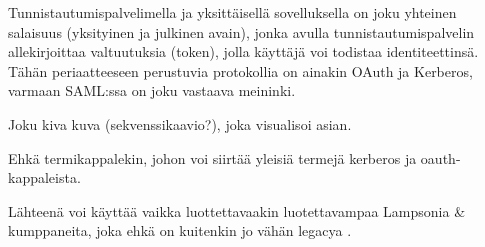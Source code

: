 Tunnistautumispalvelimella ja yksittäisellä sovelluksella on joku yhteinen salaisuus (yksityinen ja julkinen avain), jonka avulla tunnistautumispalvelin allekirjoittaa valtuutuksia (token), jolla käyttäjä voi todistaa identiteettinsä. Tähän periaatteeseen perustuvia protokollia on ainakin OAuth ja Kerberos, varmaan SAML:ssa on joku vastaava meininki.

Joku kiva kuva (sekvenssikaavio?), joka visualisoi asian.

Ehkä termikappalekin, johon voi siirtää yleisiä termejä kerberos ja oauth-kappaleista.

Lähteenä voi käyttää vaikka luottettavaakin luotettavampaa Lampsonia \& kumppaneita, joka ehkä on kuitenkin jo vähän legacya \cite{lampson}.
